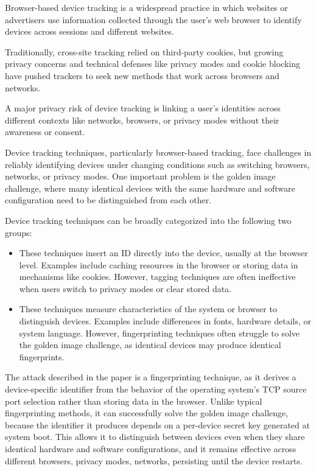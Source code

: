 \documentclass{report}
\begin{document}
\alert{Browser-based device tracking} is a widespread practice in which websites or advertisers use information collected through the user’s web browser to identify devices across sessions and different websites.

Traditionally, cross-site tracking relied on \alert{third-party cookies}, but growing privacy concerns and technical defenses like privacy modes and cookie blocking have pushed trackers to seek new methods that work across browsers and networks.

A major \alert{privacy risk} of device tracking is linking a user’s identities across different contexts like networks, browsers, or privacy modes without their awareness or consent.


Device tracking techniques, particularly browser-based tracking, face challenges in reliably identifying devices under changing conditions such as switching browsers, networks, or privacy modes. One important problem is the \alert{golden image challenge}, where many identical devices with the same hardware and software configuration need to be distinguished from each other.

Device tracking techniques can be broadly categorized into the following two groups:

\begin{itemize}
	\item {} These techniques insert an ID directly into the device, usually at the browser level. Examples include caching resources in the browser or storing data in mechanisms like cookies. However, tagging techniques are often ineffective when users switch to privacy modes or clear stored data.

	\item {} These techniques measure characteristics of the system or browser to distinguish devices. Examples include differences in fonts, hardware details, or system language. However, fingerprinting techniques often struggle to solve the golden image challenge, as identical devices may produce identical fingerprints.
\end{itemize}

The attack described in the paper is a \alert{fingerprinting technique}, as it derives a device-specific identifier from the behavior of the operating system’s TCP source port selection rather than storing data in the browser. Unlike typical fingerprinting methods, it can successfully solve the \alert{golden image challenge}, because the identifier it produces depends on a per-device secret key generated at system boot. This allows it to distinguish between devices even when they share identical hardware and software configurations, and it remains effective across different browsers, privacy modes, networks, persisting until the device restarts.
\end{document}
